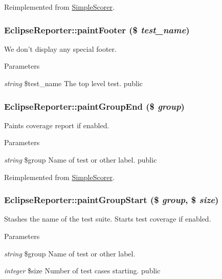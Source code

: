 Reimplemented from \hyperlink{class_simple_scorer_a25656682bd645cf156f3a2a87893d8b3}{SimpleScorer}.\hypertarget{class_eclipse_reporter_a7afc6971e74282f43d57245bffc93594}{
\subsubsection[{paintFooter}]{\setlength{\rightskip}{0pt plus 5cm}EclipseReporter::paintFooter (\$ {\em test\_\-name})}}
\label{class_eclipse_reporter_a7afc6971e74282f43d57245bffc93594}
We don't display any special footer. 
\begin{DoxyParams}{Parameters}
\item[{\em string}]\$test\_\-name The top level test.  public \end{DoxyParams}
\hypertarget{class_eclipse_reporter_aa0cb1e290d9ea75c0ac19efe06b55992}{
\subsubsection[{paintGroupEnd}]{\setlength{\rightskip}{0pt plus 5cm}EclipseReporter::paintGroupEnd (\$ {\em group})}}
\label{class_eclipse_reporter_aa0cb1e290d9ea75c0ac19efe06b55992}
Paints coverage report if enabled. 
\begin{DoxyParams}{Parameters}
\item[{\em string}]\$group Name of test or other label.  public \end{DoxyParams}


Reimplemented from \hyperlink{class_simple_scorer_a40b030cbba90f114374191cbed7d459d}{SimpleScorer}.\hypertarget{class_eclipse_reporter_a80a6d39b62ad92ee63da0c0b3011c294}{
\subsubsection[{paintGroupStart}]{\setlength{\rightskip}{0pt plus 5cm}EclipseReporter::paintGroupStart (\$ {\em group}, \/  \$ {\em size})}}
\label{class_eclipse_reporter_a80a6d39b62ad92ee63da0c0b3011c294}
Stashes the name of the test suite. Starts test coverage if enabled. 
\begin{DoxyParams}{Parameters}
\item[{\em string}]\$group Name of test or other label. \item[{\em integer}]\$size Number of test cases starting.  public \end{DoxyParams}


